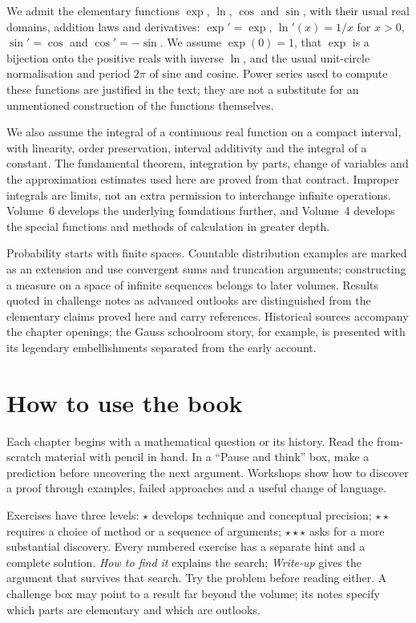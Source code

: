 We admit the elementary functions $\exp$, $\ln$, $\cos$ and $\sin$, with their
usual real domains, addition laws and derivatives: $\exp'=\exp$, $\ln'(x)=1/x$
for $x>0$, $\sin'=\cos$ and $\cos'=-\sin$. We assume $\exp(0)=1$, that $\exp$ is
a bijection onto the positive reals with inverse $\ln$, and the usual unit-circle
normalisation and period $2\pi$ of sine and cosine. Power series used to compute
these functions are justified in the text; they are not a substitute for an
unmentioned construction of the functions themselves.

We also assume the integral of a continuous real function on a compact interval,
with linearity, order preservation, interval additivity and the integral of a
constant. The fundamental theorem, integration by parts, change of variables and
the approximation estimates used here are proved from that contract. Improper
integrals are limits, not an extra permission to interchange infinite operations.
Volume~6 develops the underlying foundations further, and Volume~4 develops the
special functions and methods of calculation in greater depth.

Probability starts with finite spaces. Countable distribution examples are marked
as an extension and use convergent sums and truncation arguments; constructing a
measure on a space of infinite sequences belongs to later volumes. Results quoted
in challenge notes as advanced outlooks are distinguished from the elementary
claims proved here and carry references. Historical sources accompany the
chapter openings; the Gauss schoolroom story, for example, is presented with its
legendary embellishments separated from the early account.

\section*{How to use the book}
Each chapter begins with a mathematical question or its history. Read the
from-scratch material with pencil in hand. In a ``Pause and think'' box, make a
prediction before uncovering the next argument. Workshops show how to discover a
proof through examples, failed approaches and a useful change of language.

Exercises have three levels: $\star$ develops technique and conceptual precision;
$\star\star$ requires a choice of method or a sequence of arguments;
$\star\star\star$ asks for a more substantial discovery. Every numbered exercise
has a separate hint and a complete solution. \emph{How to find it} explains the
search; \emph{Write-up} gives the argument that survives that search. Try the
problem before reading either. A challenge box may point to a result far beyond
the volume; its notes specify which parts are elementary and which are outlooks.


